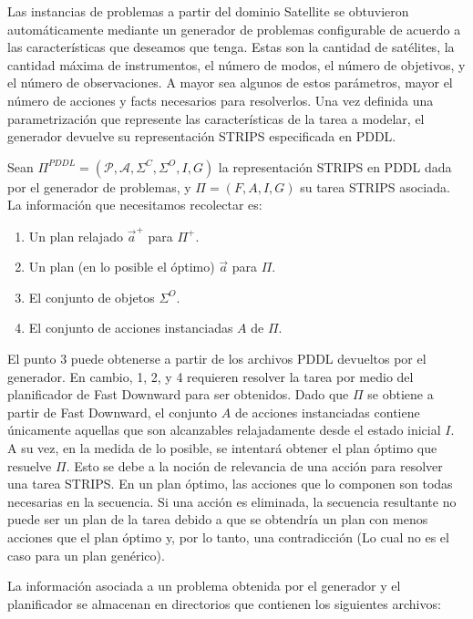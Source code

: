Las instancias de problemas a partir del dominio Satellite se obtuvieron
automáticamente mediante un generador de problemas configurable de acuerdo a las
características que deseamos que tenga. Estas son la cantidad de satélites, la
cantidad máxima de instrumentos, el número de modos, el número de objetivos, y
el número de observaciones. A mayor sea algunos de estos parámetros, mayor el
número de acciones y facts necesarios para resolverlos. Una vez definida una
parametrización que represente las características de la tarea a modelar, el
generador devuelve su representación STRIPS especificada en PDDL.


Sean $\Pi^{PDDL} = (\mathcal{P}, \mathcal{A}, \Sigma^{C}, \Sigma^{O}, I, G)$ la
representación STRIPS en PDDL dada por el generador de problemas, y $\Pi = (F,
A, I, G)$ su tarea STRIPS asociada. La información que necesitamos recolectar
es:

\begin{enumerate}
    \item Un plan relajado $\vec{a}^{+}$ para $\Pi^{+}$.
    \item Un plan (en lo posible el óptimo) $\vec{a}$ para $\Pi$.
    \item El conjunto de objetos $\Sigma^{O}$.
    \item El conjunto de acciones instanciadas $A$ de $\Pi$.
\end{enumerate}

El punto 3 puede obtenerse a partir de los archivos PDDL devueltos por
el generador. En cambio, 1, 2, y 4 requieren resolver la tarea por medio del
planificador de Fast Downward para ser obtenidos. Dado que $\Pi$ se obtiene a
partir de Fast Downward, el conjunto $A$ de acciones instanciadas contiene
únicamente aquellas que son alcanzables relajadamente desde el estado inicial
$I$. A su vez, en la medida de lo posible, se intentará obtener el plan óptimo
que resuelve $\Pi$. Esto se debe a la noción de relevancia de una acción para
resolver una tarea STRIPS. En un plan óptimo, las acciones que lo componen son
todas necesarias en la secuencia. Si una acción es eliminada, la secuencia
resultante no puede ser un plan de la tarea debido a que se obtendría un plan
con menos acciones que el plan óptimo y, por lo tanto, una contradicción (Lo cual
no es el caso para un plan genérico).

La información asociada a un problema obtenida por el generador y el
planificador se almacenan en directorios que contienen los siguientes archivos:

